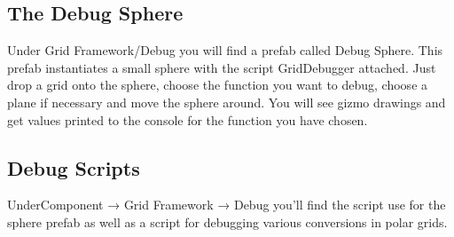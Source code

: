 \subsection*{The Debug Sphere }

Under Grid Framework/\+Debug you will find a prefab called Debug Sphere. This prefab instantiates a small sphere with the script Grid\+Debugger attached. Just drop a grid onto the sphere, choose the function you want to debug, choose a plane if necessary and move the sphere around. You will see gizmo drawings and get values printed to the console for the function you have chosen.

\subsection*{Debug Scripts }

Under\+Component → Grid Framework → Debug you’ll find the script use for the sphere prefab as well as a script for debugging various conversions in polar grids. 